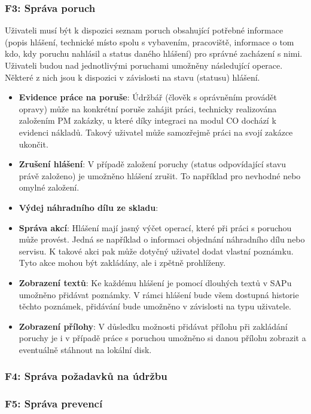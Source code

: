 \documentclass[thesis=M,czech]{FITthesis}[2012/06/26]
\begin{document}
\subsubsection{F3: Správa poruch}
Uživateli musí být k dispozici seznam poruch obsahující potřebné informace (popis hlášení, technické místo spolu s vybavením, pracoviště, informace o tom kdo, kdy poruchu nahlásil a status daného hlášení) pro správné zacházení s nimi. Uživateli budou nad jednotlivými poruchami umožněny následující operace. Některé z nich jsou k dispozici v závislosti na stavu (statusu) hlášení.
\begin{itemize}
	\item
	\textbf{Evidence práce na poruše}: Údržbář (člověk s oprávněním provádět opravy) může na konkrétní poruše zahájit práci, technicky realizována založením PM zakázky, u které díky integraci na modul CO dochází k evidenci nákladů. Takový uživatel může samozřejmě práci na svojí zakázce ukončit.
	\item
	\textbf{Zrušení hlášení}: V případě založení poruchy (status odpovídající stavu právě založeno) je umožněno hlášení zrušit. To například pro nevhodné nebo omylné založení. 
	\item
	\textbf{Výdej náhradního dílu ze skladu}: 
	\item
	\textbf{Správa akcí}: Hlášení mají jasný výčet operací, které při práci s poruchou může provést. Jedná se například o informaci objednání náhradního dílu nebo servisu. K takové akci pak může dotyčný uživatel dodat vlastní poznámku. Tyto akce mohou být zakládány, ale i zpětně prohlíženy.
	\item
	\textbf{Zobrazení textů}: Ke každému hlášení je pomocí dlouhých textů v SAPu umožněno přidávat poznámky. V rámci hlášení bude všem dostupná historie těchto poznámek, přidávání bude umožněno v závislosti na typu uživatele.
	\item
	\textbf{Zobrazení přílohy}: V důsledku možnosti přidávat přílohu při zakládání poruchy je i v případě práce s poruchou umožněno si danou přílohu zobrazit a eventuálně stáhnout na lokální disk.
\end{itemize} 

\subsubsection{F4: Správa požadavků na údržbu}

\subsubsection{F5: Správa prevencí}
\end{document}
